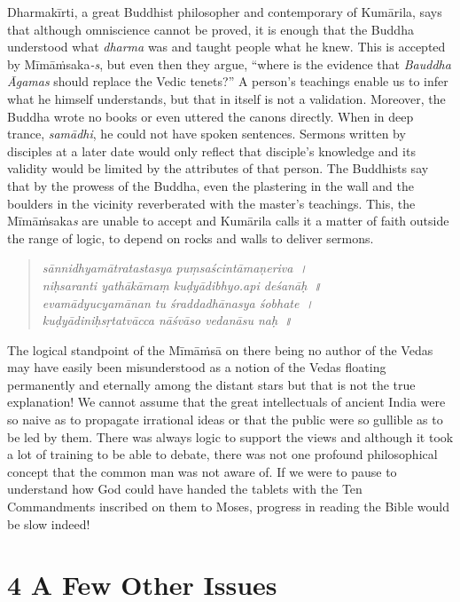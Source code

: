 Dharmakīrti, a great Buddhist philosopher and contemporary of Kumārila, says that although omniscience cannot be proved, it is enough that the Buddha understood what \textit{dharma} was and taught people what he knew. This is accepted by Mīmāṁsaka\textit{-s}, but even then they argue, “where is the evidence that \textit{Bauddha Āgamas} should replace the Vedic tenets?” A person’s teachings enable us to infer what he himself understands, but that in itself is not a validation. Moreover, the Buddha wrote no books or even uttered the canons directly. When in deep trance, \textit{samādhi}, he could not have spoken sentences. Sermons written by disciples at a later date would only reflect that disciple’s knowledge and its validity would be limited by the attributes of that person. The Buddhists say that by the prowess of the Buddha, even the plastering in the wall and the boulders in the vicinity reverberated with the master’s teachings. This, the Mīmāṁsaka\textit{s} are unable to accept and Kumārila calls it a matter of faith outside the range of logic, to depend on rocks and walls to deliver sermons.

\begin{verse}
\textit{sānnidhyamātratastasya puṃsaścintāmaṇeriva~।}\\\textit{niḥsaranti yathākāmaṃ kuḍyādibhyo.api deśanāḥ~॥} \\\textit{evamādyucyamānan tu śraddadhānasya śobhate~।}\\\textit{kuḍyādiniḥsṛtatvācca nāśvāso vedanāsu naḥ~॥} 
\end{verse}

The logical standpoint of the Mīmāṁsā on there being no author of the Vedas may have easily been misunderstood as a notion of the Vedas floating permanently and eternally among the distant stars but that is not the true explanation! We cannot assume that the great intellectuals of ancient India were so naive as to propagate irrational ideas or that the public were so gullible as to be led by them. There was always logic to support the views and although it took a lot of training to be able to debate, there was not one profound philosophical concept that the common man was not aware of. If we were to pause to understand how God could have handed the tablets with the Ten Commandments inscribed on them to Moses, progress in reading the Bible would be slow indeed!



\section*{4 A Few Other Issues}

